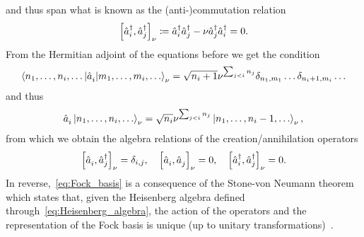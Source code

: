 and thus span what is known as the (anti-)commutation relation
\begin{align}
    \left[ \hat a^\dag_i, \hat a^\dag_j \right]_\nu \coloneqq \hat a^\dag_i \hat a^\dag_j - \nu \hat a^\dag_j \hat a^\dag_i = 0.
\end{align}
From the Hermitian adjoint of the equations before we get the condition
\begin{align}
   \braket{n_1,\dots,n_i,\dots | \hat a^\pdag_i | m_1, \dots, m_i,\dots}_\nu =
   \sqrt{n_i+1}\nu^{\sum_{j<i}n_j} \delta_{n_1,m_1}\dots\delta_{n_i+1,m_i}\dots
\end{align}
and thus
\begin{align}
   \hat a^\pdag_i \ket{n_1, \dots, n_i,\dots}_\nu =
   \sqrt{n_i}\nu^{\sum_{j<i}n_j} \ket{n_1, \dots, n_i-1,\dots}_\nu,
   \label{eq:annihilation}
\end{align}
from which we obtain the algebra relations of the creation/annihilation operators
\begin{align}
    \commutator{\hat a^\pdag_i,\hat a^\dag_j}_\nu = \delta_{i,j},
    \quad
    \commutator{\hat a^\pdag_i,\hat a^\pdag_j}_\nu = 0,
    \quad
    \commutator{\hat a^\dag_i,\hat a^\dag_j}_\nu = 0.
    \label{eq:Heisenberg_algebra}
\end{align}
In reverse,~\cref{eq:Fock_basis} is a consequence of the Stone-von Neumann theorem which states that, given the Heisenberg algebra defined through~\cref{eq:Heisenberg_algebra}, the action of the operators and the representation of the Fock basis is unique (up to unitary transformations)~\cite{Hall2013}.

